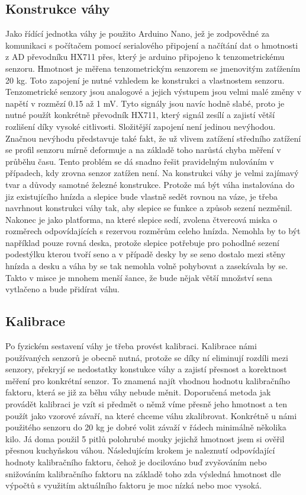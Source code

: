 \subsection*{Konstrukce váhy}
Jako řídící jednotka váhy je použito Arduino Nano, jež je zodpovědné za komunikaci s počítačem pomocí serialového připojení a načítání dat o hmotnosti z AD převodníku HX711 přes, který je arduino připojeno k tenzometrickému senzoru.
Hmotnost je měřena tenzometrickým senzorem se jmenovitým zatížením 20 kg.
Toto zapojení je nutné vzhledem ke konstrukci a vlastnostem senzoru.
Tenzometrické senzory jsou analogové a jejich výstupem jsou velmi malé změny v napětí v rozmězí 0.15 až 1 mV.
Tyto signály jsou navíc hodně slabé, proto je nutné použít konkrétně převodník HX711, který signál zesílí a zajistí větší rozlišení díky vysoké citlivosti.
Složitější zapojení není jedinou nevýhodou.
Značnou nevýhodu představuje také fakt, že už vlivem zatížení středního zatížení se profil senzoru mírně deformuje a na základě toho narůstá chyba měření v průběhu času.
Tento problém se dá snadno řešit pravidelným nulováním v případech, kdy zrovna senzor zatížen není.
Na konstrukci váhy je velmi zajímavý tvar a důvody samotné železné konstrukce.
Protože má být váha instalována do jiz existujícího hnízda a slepice bude vlastně sedět rovnou na váze, je třeba navrhnout konstrukci váhy tak, aby slepice se funkce a způsob sezení nezměnil.
Nakonec je jako platforma, na které slepice sedí, zvolena čtvercová miska o rozměrech odpovídajících s rezervou rozměrům celeho hnízda.
Nemohla by to být například pouze rovná deska, protože slepice potřebuje pro pohodlné sezení podestýlku kterou tvoří seno a v případě desky by se seno dostalo mezi stěny hnízda a desku a váha by se tak nemohla volně pohybovat a zasekávala by se.
Takto v misce je mnohem menší šance, že bude nějak větší množství sena vytlačeno a bude přidírat váhu.

\subsection*{Kalibrace}
Po fyzickém sestavení váhy je třeba provést kalibraci.
Kalibrace námi používaných senzorů je obecně nutná, protože se díky ní eliminují rozdíli mezi senzory, překryjí se nedostatky konstukce váhy a zajistí přesnost a korektnost měření pro konkrétní senzor.
To znamená najít vhodnou hodnotu kalibračního faktoru, která se již za běhu váhy nebude měnit.
Doporučená metoda jak provádět kalibraci je vzít si předmět o němž víme přesně jeho hmotnost a ten použít jako vzorové závaří, na které chceme váhu zkalibrovat.
Konkrétně u námi použitého senzoru do 20 kg je dobré volit závaží v řádech minimálně několika kilo.
Já doma použil 5 pitlů polohrubé mouky jejichž hmotnost jsem si ověřil přesnou kuchyňskou váhou.
Následujícím krokem je naleznutí odpovídající hodnoty kalibračního faktoru, čehož je docilováno buď zvyšováním nebo snižováním kalibračního faktoru na základě toho zda výsledná hmotnost dle výpočtů s využitím aktuálního faktoru je moc nízká nebo moc vysoká.


